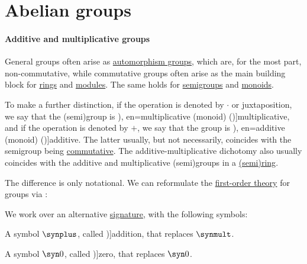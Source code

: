 \section{Abelian groups}\label{sec:abelian_groups}

\paragraph{Additive and multiplicative groups}

\begin{definition}\label{def:additive_semigroup}\mimprovised
  General groups often arise as \hyperref[def:automorphism_group]{automorphism groups}, which are, for the most part, non-commutative, while commutative groups often arise as the main building block for \hyperref[def:ring]{rings} and \hyperref[def:module]{modules}. The same holds for \hyperref[def:semigroup]{semigroups} and \hyperref[def:monoid]{monoids}.

  To make a further distinction, if the operation is denoted by \( \cdot \) or juxtaposition, we say that the (semi)group is \term[ru=мультипликативная (группа) (\cite[86]{Тыртышников2017ОсновыАлгебры}), en=multiplicative (monoid) (\cite[180]{Schechter1997AnalysisHandbook})]{multiplicative}, and if the operation is denoted by \( + \), we say that the group is \term[ru=аддитивная (группа) (\cite[85]{Тыртышников2017ОсновыАлгебры}), en=additive (monoid) (\cite[180]{Schechter1997AnalysisHandbook})]{additive}. The latter usually, but not necessarily, coincides with the semigroup being \hyperref[def:binary_operation/commutative]{commutative}. The additive-multiplicative dichotomy also usually coincides with the additive and multiplicative (semi)groups in a \hyperref[def:semiring]{(semi)ring}.

  The difference is only notational. We can reformulate the \hyperref[def:fol_theory]{first-order theory} for groups via :
  \begin{thmenum}
     We work over an alternative \hyperref[def:fol_signature]{signature}, with the following symbols:
    \begin{thmenum}
       A symbol \( \synplus \), called \term[en=addition (\cite[23]{Bourbaki1998Algebra1to3})]{addition}, that replaces \( \synmult \).

       A symbol \( \syn0 \), called \term[en=zero element (\cite[3]{Lang2002Algebra})]{zero}, that replaces \( \syn0 \).


\end{thmenum}
\end{thmenum}
\end{definition}
